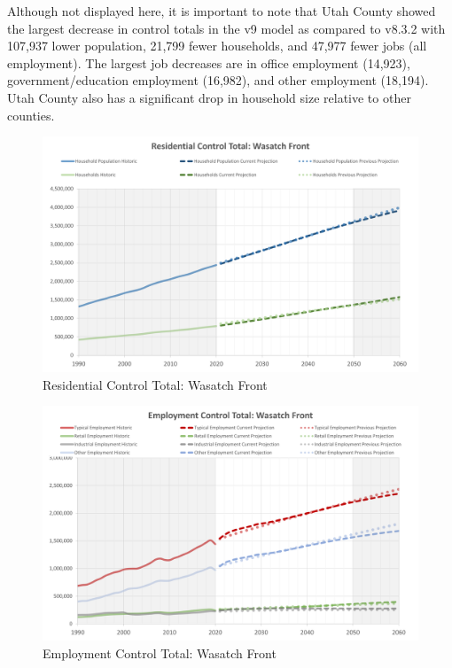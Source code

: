 \documentclass[
  letterpaper,
  DIV=11,
  numbers=noendperiod,
  titlepage=false]{scrreprt}
\begin{document}
Although not displayed here, it is important to note that Utah County
showed the largest decrease in control totals in the v9 model as
compared to v8.3.2 with 107,937 lower population, 21,799 fewer
households, and 47,977 fewer jobs (all employment). The largest job
decreases are in office employment (14,923), government/education
employment (16,982), and other employment (18,194). Utah County also has
a significant drop in household size relative to other counties.

\begin{figure}[H]

{\centering \includegraphics{v9x/v900/whats-new/_pictures/pdf-residential-control.png}

}

\caption{\label{fig-pdf-res-control}Residential Control Total: Wasatch
Front}

\end{figure}

\begin{figure}[H]

{\centering \includegraphics{v9x/v900/whats-new/_pictures/pdf-employment-control.png}

}

\caption{\label{fig-pdf-emp-control}Employment Control Total: Wasatch
Front}

\end{figure}
\end{document}
